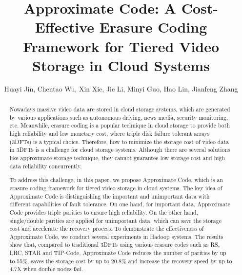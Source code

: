 \documentclass[sigconf]{acmart}
\begin{document}
\title{Approximate Code: A Cost-Effective Erasure Coding Framework for Tiered Video Storage in Cloud Systems}

\author{Huayi Jin, Chentao Wu, Xin Xie, Jie Li, Minyi Guo, Hao Lin, Jianfeng Zhang}

\begin{abstract}
Nowadays massive video data are stored in cloud storage systems, which are generated by various applications such as autonomous driving, news media, security monitoring, etc. Meanwhile, erasure coding is a popular technique in cloud storage to provide both high reliability and low monetary cost, where triple disk failure tolerant arrays (3DFTs) is a typical choice. Therefore, how to minimize the storage cost of video data in 3DFTs is a challenge for cloud storage systems. Although there are several solutions like approximate storage technique, they cannot guarantee low storage cost and high data reliability concurrently.

To address this challenge, in this paper, we propose Approximate Code, which is an erasure coding framework for tiered video storage in cloud systems. The key idea of Approximate Code is distinguishing the important and unimportant data with different capabilities of fault tolerance. On one hand, for important data, Approximate Code provides triple parities to ensure high reliability. On the other hand, single/double parities are applied for unimportant data, which can save the storage cost and accelerate the recovery process. To demonstrate the effectiveness of Approximate Code, we conduct several experiments in Hadoop systems. The results show that, compared to traditional 3DFTs using various erasure codes such as RS, LRC, STAR and TIP-Code, Approximate Code reduces the number of parities by up to 55\%, saves the storage cost by up to 20.8\% and increase the recovery speed by up to 4.7X when double nodes fail.
\end{abstract}


\maketitle
\end{document}
